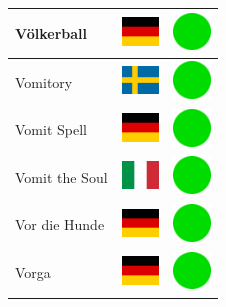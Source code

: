 \documentclass[12pt, a4paper, twoside]{report}
\begin{document}
\begin{center}
\begin{longtable}{|p{5cm}|p{2cm}|p{2cm}|}
 Völkerball                                                 & \includegraphics[width=1cm]{../img/flags/de} &   \includegraphics[width=1cm]{../likes/y} \\ \hline
 Vomitory                                                   & \includegraphics[width=1cm]{../img/flags/se} &   \includegraphics[width=1cm]{../likes/y} \\ \hline
 Vomit Spell                                                & \includegraphics[width=1cm]{../img/flags/de} &   \includegraphics[width=1cm]{../likes/y} \\ \hline
 Vomit the Soul                                             & \includegraphics[width=1cm]{../img/flags/it} &   \includegraphics[width=1cm]{../likes/y} \\ \hline
 Vor die Hunde                                              & \includegraphics[width=1cm]{../img/flags/de} &   \includegraphics[width=1cm]{../likes/y} \\ \hline
 Vorga                                                      & \includegraphics[width=1cm]{../img/flags/de} &   \includegraphics[width=1cm]{../likes/y} \\ \hline

\end{longtable}
\end{center}
\end{document}
